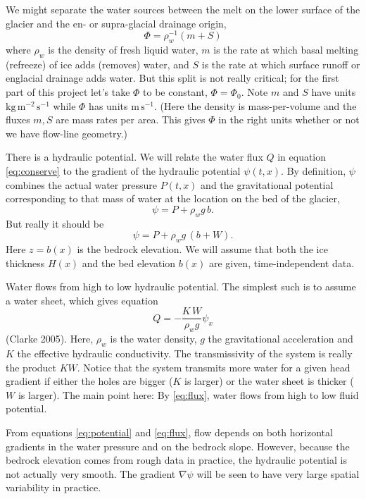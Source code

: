\documentclass[12pt,final]{amsart}%
\begin{document}
We might separate the water sources between the melt on the lower surface of the glacier and the en- or supra-glacial drainage origin,
  $$\Phi = \rho_w^{-1} \left(m + S\right)$$
where $\rho_w$ is the density of fresh liquid water, $m$ is the rate at which basal melting (refreeze) of ice adds (removes) water, and $S$ is the rate at which surface runoff or englacial drainage adds water.  But this split is not really critical; for the first part of this project let's take $\Phi$ to be constant, $\Phi=\Phi_0$.  Note $m$ and $S$ have units $\text{kg}\,\text{m}^{-2}\,\text{s}^{-1}$ while $\Phi$ has units $\text{m}\,\text{s}^{-1}$.  (Here the density is mass-per-volume and the fluxes $m,S$ are mass rates per area.  This gives $\Phi$ in the right units whether or not we have flow-line geometry.)

There is a hydraulic potential.  We will relate the water flux $Q$ in equation \eqref{eq:conserve} to the gradient of the hydraulic potential $\psi(t,x)$.  By definition, $\psi$ combines the actual water pressure $P(t,x)$ and the gravitational potential corresponding to that mass of water at the location on the bed of the glacier,
\begin{equation} \label{eq:oldpotential}
\psi = P + \rho_w g\, b.
\end{equation}
But really it should be
\begin{equation} \label{eq:potential}
\psi = P + \rho_w g\, (b+W).
\end{equation}
Here $z=b(x)$ is the bedrock elevation.  We will assume that both the ice thickness $H(x)$ and the bed elevation $b(x)$ are given, time-independent data.

Water flows from high to low hydraulic potential.  The simplest such is to assume a water sheet, which gives equation
\begin{equation}
Q = - \frac{K \, W}{\rho_w g} \psi_x
\label{eq:flux}
\end{equation}
(Clarke 2005).  Here, $\rho_w$ is the water density, $g$ the gravitational acceleration and $K$ the effective hydraulic conductivity.  The transmissivity of the system is really the product $KW$.  Notice that the system transmits more water for a given head gradient if either the holes are bigger ($K$ is larger) or the water sheet is thicker ($W$ is larger).  The main point here: By \eqref{eq:flux}, water flows from high to low fluid potential.  

From equations \eqref{eq:potential} and \eqref{eq:flux}, flow depends on both horizontal gradients in the water pressure and on the bedrock slope.  However, because the bedrock elevation comes from rough data in practice, the hydraulic potential is not actually very smooth.  The gradient $\nabla \psi$ will be seen to have very large spatial variability in practice.
\end{document}
